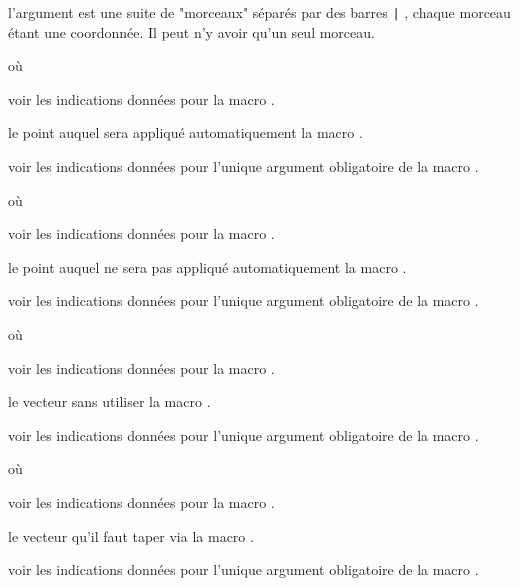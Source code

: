\documentclass[12pt,a4paper]{article}
\begin{document}
\IDarg{} l'argument est une suite de "morceaux" séparés par des barres \verb+|+ , chaque morceau étant une coordonnée. Il peut n'y avoir qu'un seul morceau.


\separation


 où \quad {}

\IDoption{} voir les indications données pour la macro .

 le point auquel sera appliqué automatiquement la macro .

 voir les indications données pour l'unique argument obligatoire de la macro .


\separation


 où \quad {}

\IDoption{} voir les indications données pour la macro .

 le point auquel ne sera pas appliqué automatiquement la macro .

 voir les indications données pour l'unique argument obligatoire de la macro .


\separation


 où \quad {}

\IDoption{} voir les indications données pour la macro .

 le vecteur sans utiliser la macro .

 voir les indications données pour l'unique argument obligatoire de la macro .


\separation


 où \quad {}

\IDoption{} voir les indications données pour la macro .

 le vecteur qu'il faut taper via la macro .

 voir les indications données pour l'unique argument obligatoire de la macro .
\end{document}
